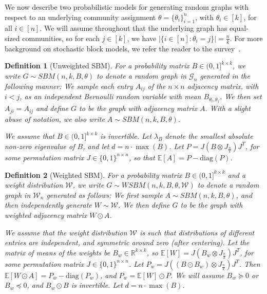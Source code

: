 \documentclass{article}
\newtheorem{definition}{Definition}
\begin{document}
We now describe two probabilistic models for generating random graphs with respect to an underlying community assignment $\theta = \{\theta_i\}_{i = 1}^n$, with $\theta_i \in [k]$, for all $i \in [n]$. We will assume throughout that the underlying graph has equal-sized communities, so for each $j \in [k]$, we have $\left|\{i \in [n]: \theta_i = j\}\right| = \frac{n}{k}$. For more background on stochastic block models, we refer the reader to the survey~\cite{abbe2018community}.

\begin{definition}[Unweighted SBM]
\label{DefSBM}
For a probability matrix $B \in (0,1]^{k \times k}$, we write $G \sim SBM(n, k, B, \theta)$ to denote a random graph in $\mathcal{G}_n$ generated in the following manner: We sample each entry $A_{ij}$ of the $n \times n$ adjacency matrix, with $i < j$, as an independent Bernoulli random variable with mean $B_{\theta_i, \theta_j}$. We then set $A_{ji} = A_{ij}$ and define $G$ to be the graph with adjacency matrix $A$. With a slight abuse of notation, we also write $A \sim SBM(n, k, B, \theta)$.

We assume that $B \in (0, 1]^{k \times k}$ is invertible. Let $\lambda_B$ denote the smallest absolute non-zero eigenvalue of $B$, and let $d = n\cdot\mathop{\max}(B)$. Let $P = J(B\otimes J_{\frac{n}{k}})J^T$, for some permutation matrix $J \in \{0, 1\}^{n \times n}$, so that $\mathbb{E}[A] = P - \mathrm{diag}(P)$.
\end{definition}

\begin{definition}[Weighted SBM]
\label{DefWeightSBM}
For a probability matrix $B \in (0,1]^{k \times k}$ and a weight distribution $\mathscr{W}$, we write $G \sim WSBM(n, k, B, \theta, \mathscr{W})$ to denote a random graph in $\mathcal{W}_n$ generated as follows: We first sample $A \sim SBM(n, k, B, \theta)$, and then independently generate $W \sim \mathscr{W}$. We then define $G$ to be the graph with weighted adjacency matrix $W \odot A$.

We assume that the weight distribution $\mathscr{W}$ is such that distributions of different entries are independent, and symmetric around zero (after centering). Let the matrix of means of the weights be $B_w \in \mathbb{R}^{k \times k}$, so $\mathbb{E}[W] = J(B_w \otimes J_{\frac{n}{k}})J^T$, for some permutation matrix $J \in \{0, 1\}^{n \times n}$. Let $P_w = J((B \odot B_w)\otimes J_{\frac{n}{k}})J^T$. Then $\mathbb{E}[W \odot A] = P_w - \mathrm{diag}(P_w)$, and $P_w = \mathbb{E}[W]\odot P$. We will assume $B_w \succeq 0$ or $B_w \preceq 0$, and $B_w \odot B$ is invertible. Let $d = n\cdot\mathop{\max}(B)$.
\end{definition}
\end{document}
